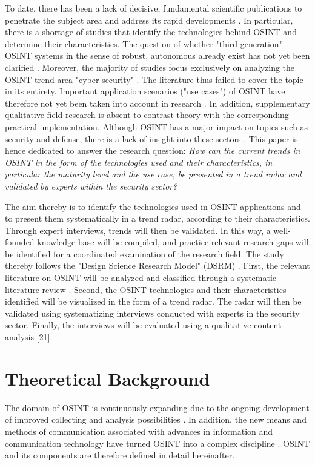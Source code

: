 \documentclass[10pt]{article}
\begin{document}
To date, there has been a lack of decisive, fundamental scientific publications to penetrate
the subject area \cite{HerreraCubides.2020} and address its rapid
developments \cite{Ghioni.2023, Williams.2018}. In particular, there is a shortage of
studies that identify the technologies behind OSINT and determine their characteristics.
The question of whether "third generation" OSINT systems in the sense of
robust, autonomous \cite{PastorGalindo.2019, PastorGalindo.2020} already exist
has not yet been clarified \cite{Ghioni.2023, PastorGalindo.2020,Yogish.2021}.
Moreover, the majority of studies focus exclusively on analyzing the OSINT trend area "cyber
security" \cite{Hwang.2022, PastorGalindo.2019, Yogish.2021}. The literature thus failed to
cover the topic in its entirety. Important application scenarios ("use cases") of OSINT have
therefore not yet been taken into account in research \cite{AlKilani.2021, Dokman.2020, Ghioni.2023}.
In addition, supplementary qualitative field research is absent to contrast theory with
the corresponding practical implementation. Although OSINT has a major impact on topics
such as security and defense, there is a lack of insight into these sectors \cite{HerreraCubides.2020, PastorGalindo.2019}.
This paper is hence dedicated to answer the research question:
\textit{How can the current trends in OSINT in the form of the technologies used and their
    characteristics, in particular the maturity level and the use case, be presented in a
    trend radar and validated by experts within the security sector?}

The aim thereby is to identify the technologies used in OSINT applications and to present
them systematically in a trend radar, according to their characteristics. Through expert
interviews, trends will then be validated. In this way, a well-founded knowledge base will
be compiled, and practice-relevant research gaps will be identified for a coordinated examination
of the research field. The study thereby follows the "Design Science Research Model" (DSRM)
\cite{Peffers.2007}.  First, the relevant literature on OSINT will be analyzed and classified
through a systematic literature review \cite{Webster.2002}. Second, the OSINT technologies and
their characteristics identified will be visualized in the form of a trend radar. The radar
will then be validated using systematizing interviews \cite{Bogner.2014} conducted with
experts in the security sector. Finally, the interviews will be evaluated using a
qualitative content analysis [21].


\section{Theoretical Background}
The domain of OSINT is continuously expanding due to the ongoing development of improved
collecting and analysis possibilities \cite{AlKilani.2021, Ghioni.2023, Williams.2018}. In
addition, the new means and methods of communication associated with advances in information
and communication technology have turned OSINT into a complex discipline
\cite{AlKilani.2021, Benes.2013, Chen.2012, Williams.2018}. OSINT and its
components are therefore defined in detail hereinafter.
\end{document}
